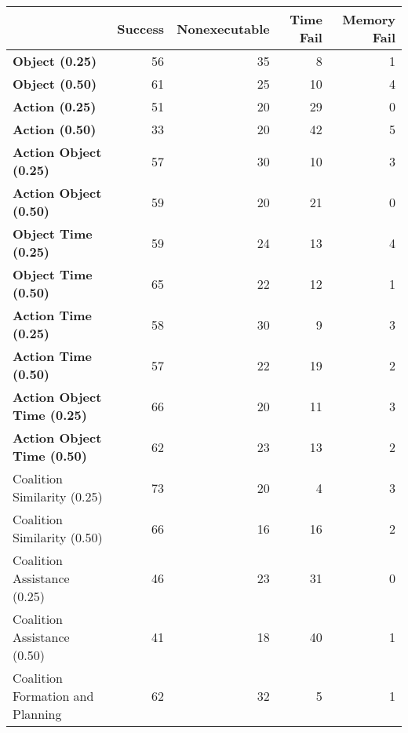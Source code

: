 \begin{tabular}{lrrrr}
\hline
                                    &   Success &   Nonexecutable &   Time Fail &   Memory Fail \\
\hline
 \textbf{Object (0.25)}             &        56 &              35 &           8 &             1 \\
 \textbf{Object (0.50)}             &        61 &              25 &          10 &             4 \\
 \textbf{Action (0.25)}             &        51 &              20 &          29 &             0 \\
 \textbf{Action (0.50)}             &        33 &              20 &          42 &             5 \\
 \textbf{Action Object (0.25)}      &        57 &              30 &          10 &             3 \\
 \textbf{Action Object (0.50)}      &        59 &              20 &          21 &             0 \\
 \textbf{Object Time (0.25)}        &        59 &              24 &          13 &             4 \\
 \textbf{Object Time (0.50)}        &        65 &              22 &          12 &             1 \\
 \textbf{Action Time (0.25)}        &        58 &              30 &           9 &             3 \\
 \textbf{Action Time (0.50)}        &        57 &              22 &          19 &             2 \\
 \textbf{Action Object Time (0.25)} &        66 &              20 &          11 &             3 \\
 \textbf{Action Object Time (0.50)} &        62 &              23 &          13 &             2 \\
 Coalition Similarity (0.25)        &        73 &              20 &           4 &             3 \\
 Coalition Similarity (0.50)        &        66 &              16 &          16 &             2 \\
 Coalition Assistance (0.25)        &        46 &              23 &          31 &             0 \\
 Coalition Assistance (0.50)        &        41 &              18 &          40 &             1 \\
 Coalition Formation and Planning   &        62 &              32 &           5 &             1 \\
\hline
\end{tabular}
